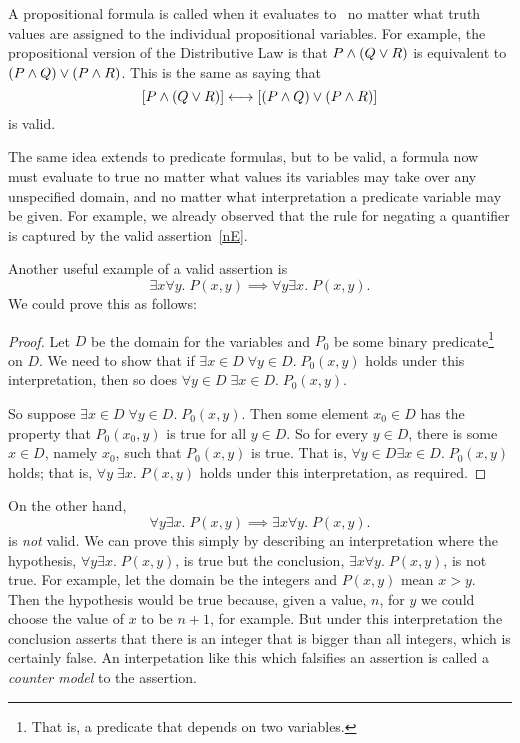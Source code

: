 A propositional formula is called  when it evaluates to \true\
no matter what truth values are assigned to the individual propositional
variables.  For example, the propositional version of the Distributive Law
is that $P \wedge (Q \vee R)$ is equivalent to $(P \wedge Q) \vee (P \wedge
R)$.  This is the same as saying that
\[
[P \wedge (Q \vee R)] \longleftrightarrow [(P \wedge Q) \vee (P \wedge R)]
\]
is valid.

The same idea extends to predicate formulas, but to be valid, a
formula now must evaluate to true no matter what values its variables
may take over any unspecified domain, and no matter what
interpretation a predicate variable may be given.  For example, we
already observed that the rule for negating a quantifier is captured
by the valid assertion~\eqref{nE}.

Another useful example of a valid assertion is
\[
\exists x \forall y.\; P(x,y) \implies \forall y \exists x.\; P(x,y).
\]
We could prove this as follows:
\begin{proof}
Let $D$ be the domain for the variables and $P_0$ be some
binary predicate\footnote{That is, a predicate that depends on two variables.}
on $D$.  We need to show that if $\exists x \in D\; \forall y \in D.\;
P_0(x,y)$ holds under this interpretation, then so does $\forall y \in D\;
\exists x \in D.\; P_0(x,y)$.

So suppose $\exists x \in D\; \forall y \in D.\; P_0(x,y)$.  Then some
element $x_0 \in D$ has the property that $P_0(x_0, y)$ is true for all $y
\in D$.  So for every $y \in D$, there is some $x \in D$, namely $x_0$,
such that $P_0(x,y)$ is true.  That is, $\forall y \in D\exists x \in D.\;
P_0(x,y)$ holds; that is, $\forall y\; \exists x.\; P(x,y)$ holds under this
interpretation, as required.
\end{proof}

On the other hand,
\[
\forall y \exists x.\; P(x,y) \implies \exists x \forall y.\; P(x,y).
\]
is \emph{not} valid.  We can prove this simply by describing an
interpretation where the hypothesis, $\forall y \exists x.\; P(x,y)$, is
true but the conclusion, $\exists x \forall y.\; P(x,y)$, is not true.
For example, let the domain be the integers and $P(x,y)$ mean $x > y$.
Then the hypothesis would be true because, given a value, $n$, for $y$ we
could choose the value of $x$ to be $n+1$, for example.  But under this
interpretation the conclusion asserts that there is an integer that is
bigger than all integers, which is certainly false.  An interpetation like
this which falsifies an assertion is called a \emph{counter model} to the
assertion.


